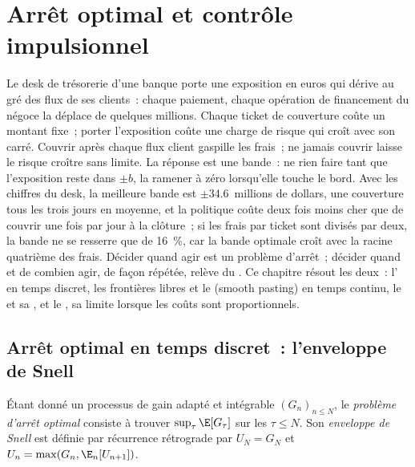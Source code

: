 \chapter{Arrêt optimal et contrôle impulsionnel}\label{ch:qm:optimal-stopping-and-impulse-control}

Le desk de trésorerie d'une banque porte une exposition en euros qui dérive au gré des flux de ses clients~: chaque paiement,
chaque opération de financement du négoce la déplace de quelques millions. Chaque ticket de couverture coûte un montant fixe~; porter
l'exposition coûte une charge de risque qui croît avec son carré. Couvrir après chaque flux client gaspille les frais~;
ne jamais couvrir laisse le risque croître sans limite. La réponse est une bande~: ne rien faire tant que l'exposition reste
dans $\pm b$, la ramener à zéro lorsqu'elle touche le bord. Avec les chiffres du desk, la meilleure bande est
$\pm$34.6~millions de dollars, une couverture tous les trois jours en moyenne, et la politique coûte deux fois moins cher que de couvrir
une fois par jour à la clôture~; si les frais par ticket sont divisés par deux, la bande ne se resserre que de 16~\%, car la bande
optimale croît avec la racine quatrième des frais. Décider quand agir est un problème d'arrêt~; décider quand et de combien
agir, de façon répétée, relève du . Ce chapitre résout les deux~: l' en temps discret,
les frontières libres et le  (smooth pasting) en temps continu, le  et sa , et
le , sa limite lorsque les coûts sont proportionnels.

\section{Arrêt optimal en temps discret~: l'enveloppe de Snell}

\begin{definition}\label{def:qm:optimal-stopping-and-impulse-control:snell}
Étant donné un processus de gain adapté et intégrable $(G_n)_{n\le N}$, le \emph{problème d'arrêt optimal}
consiste à trouver $\sup_\tau\E[G_\tau]$ sur les  $\tau \le N$. Son \emph{enveloppe de Snell}
est définie par récurrence rétrograde par $U_N = G_N$ et $U_n = \max(G_n, \E_n[U_{n+1}])$.
\end{definition}


